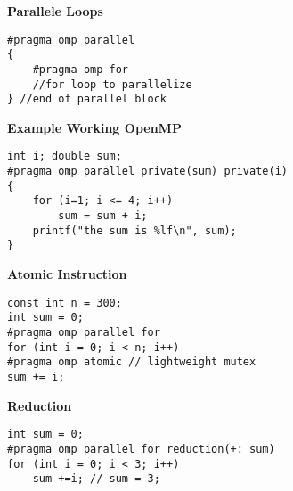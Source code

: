 \textbf{Parallele Loops}
\begin{lstlisting}[style=csharp]
#pragma omp parallel 
{
	#pragma omp for 
	//for loop to parallelize 
} //end of parallel block 
\end{lstlisting}

\textbf{Example Working OpenMP}
\begin{lstlisting}[style=csharp]
int i; double sum;
#pragma omp parallel private(sum) private(i)
{
	for (i=1; i <= 4; i++)
    	sum = sum + i;
    printf("the sum is %lf\n", sum);
}
\end{lstlisting}

\textbf{Atomic Instruction}
\begin{lstlisting}[style=csharp]
const int n = 300;
int sum = 0;
#pragma omp parallel for
for (int i = 0; i < n; i++) 
#pragma omp atomic // lightweight mutex
sum += i;
\end{lstlisting}

\textbf{Reduction}
\begin{lstlisting}[style=csharp]
int sum = 0;
#pragma omp parallel for reduction(+: sum)
for (int i = 0; i < 3; i++)
	sum +=i; // sum = 3;
\end{lstlisting}
